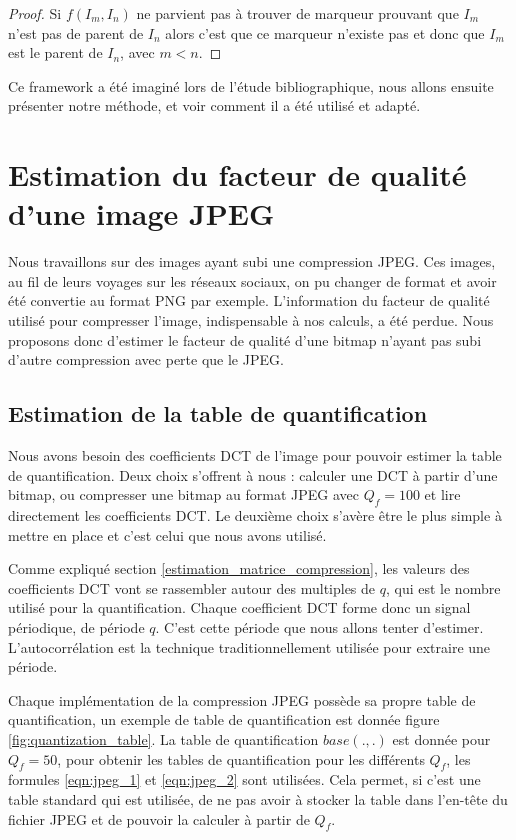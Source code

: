 \documentclass[utf8,final]{stageM2R} %
\begin{document}
\begin{proof}
  Si $f(I_{m},I_{n})$ ne parvient pas à trouver de marqueur prouvant que $I_{m}$ n'est pas de parent de $I_{n}$ alors c'est que ce marqueur n'existe pas et donc que $I_{m}$ est le parent de $I_{n}$, avec $m < n$.
\end{proof}

Ce framework a été imaginé lors de l'étude bibliographique, nous allons ensuite présenter notre méthode, et voir comment il a été utilisé et adapté.


\section{Estimation du facteur de qualité d'une image JPEG}
Nous travaillons sur des images ayant subi une compression JPEG. Ces images, au fil de leurs voyages sur les réseaux sociaux, on pu changer de format et avoir été convertie au format PNG par exemple. L'information du facteur de qualité utilisé pour compresser l'image, indispensable à nos calculs, a été perdue. Nous proposons donc d'estimer le facteur de qualité d'une bitmap n'ayant pas subi d'autre compression avec perte que le JPEG.

\subsection{Estimation de la table de quantification}
\label{sec:extraction}
Nous avons besoin des coefficients DCT de l'image pour pouvoir estimer la table de quantification. Deux choix s'offrent à nous : calculer une DCT à partir d'une bitmap, ou compresser une bitmap au format JPEG avec $Q_f = 100$ et lire directement les coefficients DCT. Le deuxième choix s'avère être le plus simple à mettre en place et c'est celui que nous avons utilisé.

Comme expliqué section \ref{estimation_matrice_compression}, les valeurs des coefficients DCT vont se rassembler autour des multiples de $q$, qui est le nombre utilisé pour la quantification. Chaque coefficient DCT forme donc un signal périodique, de période $q$. C'est cette période que nous allons tenter d'estimer. L'autocorrélation est la technique traditionnellement utilisée pour extraire une période.

Chaque implémentation de la compression JPEG possède sa propre table de quantification, un exemple de table de quantification est donnée figure \ref{fig:quantization_table}. La table de quantification $base(.,.)$ est donnée pour $Q_f = 50$, pour obtenir les tables de quantification pour les différents $Q_f$, les formules \ref{eqn:jpeg_1} et \ref{eqn:jpeg_2} sont utilisées. Cela permet, si c'est une table standard qui est utilisée, de ne pas avoir à stocker la table dans l'en-tête du fichier JPEG et de pouvoir la calculer à partir de $Q_f$.
\end{document}
